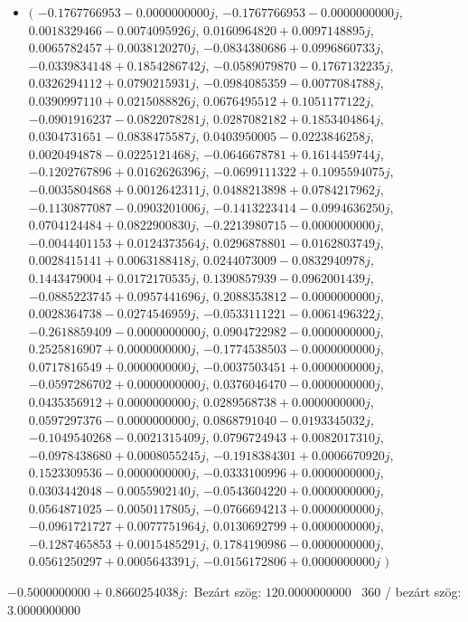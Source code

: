 \documentclass[14pt,a4paper]{article}
\begin{document}
\begin{itemize}
\item
$\big($
$-0.1767766953-0.0000000000j$, $-0.1767766953-0.0000000000j$, $0.0018329466-0.0074095926j$, $0.0160964820+0.0097148895j$, $0.0065782457+0.0038120270j$, $-0.0834380686+0.0996860733j$, $-0.0339834148+0.1854286742j$, $-0.0589079870-0.1767132235j$, $0.0326294112+0.0790215931j$, $-0.0984085359-0.0077084788j$, $0.0390997110+0.0215088826j$, $0.0676495512+0.1051177122j$, $-0.0901916237-0.0822078281j$, $0.0287082182+0.1853404864j$, $0.0304731651-0.0838475587j$, $0.0403950005-0.0223846258j$, $0.0020494878-0.0225121468j$, $-0.0646678781+0.1614459744j$, $-0.1202767896+0.0162626396j$, $-0.0699111322+0.1095594075j$, $-0.0035804868+0.0012642311j$, $0.0488213898+0.0784217962j$, $-0.1130877087-0.0903201006j$, $-0.1413223414-0.0994636250j$, $0.0704124484+0.0822900830j$, $-0.2213980715-0.0000000000j$, $-0.0044401153+0.0124373564j$, $0.0296878801-0.0162803749j$, $0.0028415141+0.0063188418j$, $0.0244073009-0.0832940978j$, $0.1443479004+0.0172170535j$, $0.1390857939-0.0962001439j$, $-0.0885223745+0.0957441696j$, $0.2088353812-0.0000000000j$, $0.0028364738-0.0274546959j$, $-0.0533111221-0.0061496322j$, $-0.2618859409-0.0000000000j$, $0.0904722982-0.0000000000j$, $0.2525816907+0.0000000000j$, $-0.1774538503-0.0000000000j$, $0.0717816549+0.0000000000j$, $-0.0037503451+0.0000000000j$, $-0.0597286702+0.0000000000j$, $0.0376046470-0.0000000000j$, $0.0435356912+0.0000000000j$, $0.0289568738+0.0000000000j$, $0.0597297376-0.0000000000j$, $0.0868791040-0.0193345032j$, $-0.1049540268-0.0021315409j$, $0.0796724943+0.0082017310j$, $-0.0978438680+0.0008055245j$, $-0.1918384301+0.0006670920j$, $0.1523309536-0.0000000000j$, $-0.0333100996+0.0000000000j$, $0.0303442048-0.0055902140j$, $-0.0543604220+0.0000000000j$, $0.0564871025-0.0050117805j$, $-0.0766694213+0.0000000000j$, $-0.0961721727+0.0077751964j$, $0.0130692799+0.0000000000j$, $-0.1287465853+0.0015485291j$, $0.1784190986-0.0000000000j$, $0.0561250297+0.0005643391j$, $-0.0156172806+0.0000000000j$
$\big)$
\end{itemize}
$-0.5000000000+0.8660254038j$:\
Bezárt szög: $120.0000000000$ \
360 / bezárt szög: $3.0000000000$\
\end{document}
